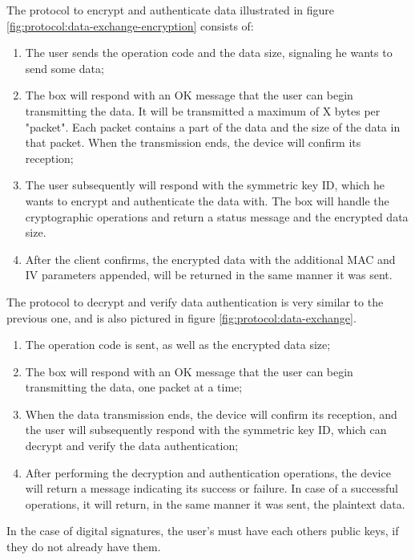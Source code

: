 The protocol to encrypt and authenticate data illustrated in figure \ref{fig:protocol:data-exchange-encryption} consists of:
\begin{enumerate}
	\item The user sends the operation code and the data size, signaling he wants to send some data;
	\item The box will respond with an OK message that the user can begin transmitting the data. It will be transmitted a maximum of X bytes per "packet". Each packet contains a part of the data and the size of the data in that packet. When the transmission ends, the device will confirm its reception;
	\item The user subsequently will respond with the symmetric key ID, which he wants to encrypt and authenticate the data with. The box will handle the cryptographic operations and return a status message and the encrypted data size.
	\item After the client confirms, the encrypted data with the additional MAC and IV parameters appended, will be returned in the same manner it was sent.
\end{enumerate}

The protocol to decrypt and verify data authentication is very similar to the previous one, and is also pictured in figure \ref{fig:protocol:data-exchange}.

\begin{enumerate}
	\item The operation code is sent, as well as the encrypted data size;
	\item The box will respond with an OK message that the user can begin transmitting the data, one packet at a time;
	\item When the data transmission ends, the device will confirm its reception, and the user will subsequently respond with the symmetric key ID, which can decrypt and verify the data authentication;
	\item After performing the decryption and authentication operations, the device will return a message indicating its success or failure. In case of a successful operations, it will return, in the same manner it was sent, the plaintext data.
\end{enumerate}

In the case of digital signatures, the user's must have each others public keys, if they do not already have them.

